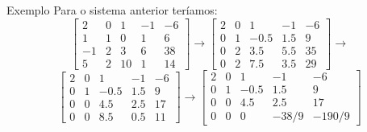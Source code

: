 \documentclass{beamer}
\begin{document}
\begin{frame}{Exemplo}
  Para o sistema anterior teríamos:
  $$
  \left[\begin{array}{cccc|c}
    2 & 0 & 1 & -1 & -6 \\
    1 & 1 & 0 & 1 & 6 \\
    -1 &   2     &    3    & 6 & 38 \\
    5 & 2 & 10 & 1 & 14
  \end{array}\right] \rightarrow \left[\begin{array}{cccc|c}
    2 & 0 & 1 & -1 & -6 \\
    0 & 1 & -0.5 & 1.5 & 9 \\
    0 &   2     &    3.5    & 5.5 & 35 \\
    0 & 2 & 7.5 & 3.5 & 29
\end{array}\right] \rightarrow
  $$
  $$
  \left[\begin{array}{cccc|c}
    2 & 0 & 1 & -1 & -6 \\
    0 & 1 & -0.5 & 1.5 & 9 \\
    0 &   0     &    4.5    & 2.5 & 17 \\
    0 & 0 & 8.5 & 0.5 & 11
  \end{array}\right] \rightarrow \left[\begin{array}{cccc|c}
    2 & 0 & 1 & -1 & -6 \\
    0 & 1 & -0.5 & 1.5 & 9 \\
    0 &   0     &    4.5    & 2.5 & 17 \\
    0 & 0 & 0 & -38/9 & -190/9
\end{array}\right]
  $$
  
\end{frame}
   
\end{document}
